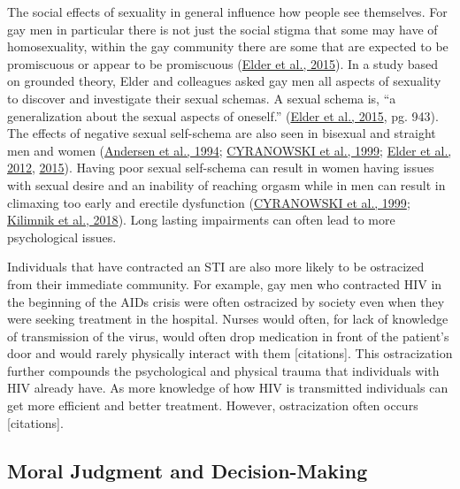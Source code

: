\documentclass[
  donotrepeattitle,doc, 12pt, a4paper,floatsintext]{apa7}
\begin{document}
The social effects of sexuality in general influence how people see themselves. For gay men in particular there is not just the social stigma that some may have of homosexuality, within the gay community there are some that are expected to be promiscuous or appear to be promiscuous (\protect\hyperlink{ref-elder2015a}{Elder et al., 2015}). In a study based on grounded theory, Elder and colleagues asked gay men all aspects of sexuality to discover and investigate their sexual schemas. A sexual schema is, ``a generalization about the sexual aspects of oneself.'' (\protect\hyperlink{ref-elder2015a}{Elder et al., 2015}, pg. 943). The effects of negative sexual self-schema are also seen in bisexual and straight men and women (\protect\hyperlink{ref-andersen1994}{Andersen et al., 1994}; \protect\hyperlink{ref-cyranowski1999}{CYRANOWSKI et al., 1999}; \protect\hyperlink{ref-elder2012}{Elder et al., 2012}, \protect\hyperlink{ref-elder2015a}{2015}). Having poor sexual self-schema can result in women having issues with sexual desire and an inability of reaching orgasm while in men can result in climaxing too early and erectile dysfunction (\protect\hyperlink{ref-cyranowski1999}{CYRANOWSKI et al., 1999}; \protect\hyperlink{ref-kilimnik2018}{Kilimnik et al., 2018}). Long lasting impairments can often lead to more psychological issues.

Individuals that have contracted an STI are also more likely to be ostracized from their immediate community. For example, gay men who contracted HIV in the beginning of the AIDs crisis were often ostracized by society even when they were seeking treatment in the hospital. Nurses would often, for lack of knowledge of transmission of the virus, would often drop medication in front of the patient's door and would rarely physically interact with them {[}citations{]}. This ostracization further compounds the psychological and physical trauma that individuals with HIV already have. As more knowledge of how HIV is transmitted individuals can get more efficient and better treatment. However, ostracization often occurs {[}citations{]}.

\hypertarget{moral-judgment-and-decision-making}{%
\subsection{Moral Judgment and Decision-Making}\label{moral-judgment-and-decision-making}}
\end{document}
